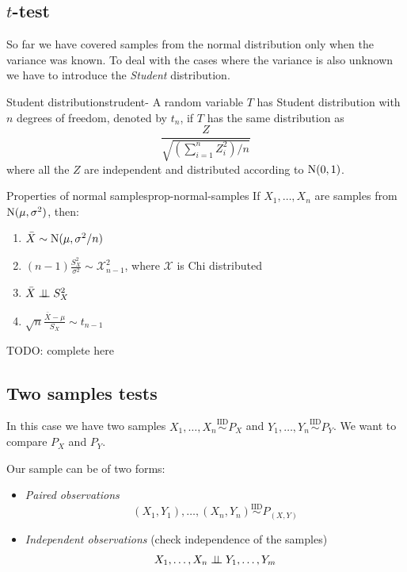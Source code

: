 \documentclass[12pt]{extarticle}
\newcommand{\Normal}{{\operatorfont N}}
\begin{document}
\subsection{\texorpdfstring{$t$}{t}-test}

So far we have covered samples from the normal distribution only when the variance was known.
To deal with the cases where the variance is also unknown we have to introduce the \emph{Student} distribution.

\begin{definition}{Student distribution}{strudent-}
    A random variable $T$ has Student distribution with $n$ degrees of freedom, denoted by $t_n$, if $T$ has the same distribution as
    \begin{equation}
        \frac{Z}{\sqrt{(\sum^n_{i=1} Z_i^2)/n}}
    \end{equation}
    where all the $Z$ are independent and distributed according to $\Normal(0,1)$.
\end{definition}

\begin{theorem}{Properties of normal samples}{prop-normal-samples}
    If $X_1, \dots, X_n$ are samples from $\Normal(\mu, \sigma^2)$, then:
    \begin{enumerate}[label=\roman*.]
        \item $\bar X \sim \Normal(\mu, \sigma^2/n)$
        \item $(n-1)\frac{S_X^2}{\sigma^2} \sim \mathcal X^2_{n-1}$, where $\mathcal X$ is Chi distributed
        \item $\bar X \perp \!\!\! \perp S_X^2$
        \item $\sqrt n \frac{\bar X - \mu}{S_X} \sim t_{n-1}$
    \end{enumerate}
\end{theorem}

TODO: complete here

\subsection{Two samples tests}

In this case we have two samples
$X_1, \dots, X_n \stackrel{\text{IID}}{\sim}P_X$ and
$Y_1, \dots, Y_n \stackrel{\text{IID}}{\sim}P_Y$.
We want to compare $P_X$ and $P_Y$.

Our sample can be of two forms:
\begin{itemize}
    \item \emph{Paired observations}
          \begin{equation}
              (X_1, Y_1), \dots, (X_n, Y_n) \stackrel{\text{IID}}{\sim} P_{(X, Y)}
          \end{equation}
    \item \emph{Independent observations} (check independence of the samples)
          \begin{equation}
              X_1, \dots, X_n \perp \!\!\! \perp Y_1, \dots, Y_m
          \end{equation}
\end{itemize}
\end{document}
